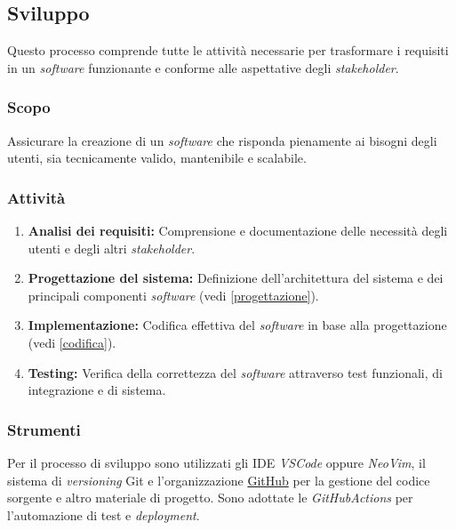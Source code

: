 \subsection{Sviluppo}

Questo processo comprende tutte le attività necessarie per trasformare i
requisiti in un \textit{software} funzionante e conforme alle aspettative degli
\textit{stakeholder}.

\subsubsection{Scopo}
Assicurare la creazione di un \textit{software} che risponda pienamente ai
bisogni degli utenti, sia tecnicamente valido, mantenibile e scalabile.

\subsubsection{Attività}
\begin{enumerate}
	\item \textbf{Analisi dei requisiti:} Comprensione e documentazione delle
	      necessità degli utenti e degli altri \textit{stakeholder}.
	\item \textbf{Progettazione del sistema:} Definizione dell'architettura del
	      sistema e dei principali componenti \textit{software} (vedi
	      \autoref{progettazione}).
	\item \textbf{Implementazione:} Codifica effettiva del \textit{software} in
	      base alla progettazione (vedi \autoref{codifica}).
	\item \textbf{Testing:} Verifica della correttezza del \textit{software}
	      attraverso test funzionali, di integrazione e di sistema.
\end{enumerate}

\subsubsection{Strumenti}
Per il processo di sviluppo sono utilizzati gli IDE \textit{VSCode} oppure
\textit{NeoVim}, il sistema di \textit{versioning} Git e l'organizzazione
\href{https://GitHub\g.com/Project-SWEnergy}{GitHub\g} per la gestione del codice
sorgente e altro materiale di progetto. Sono adottate le \textit{GitHub\g Actions}
per l'automazione di test e \textit{deployment}.
